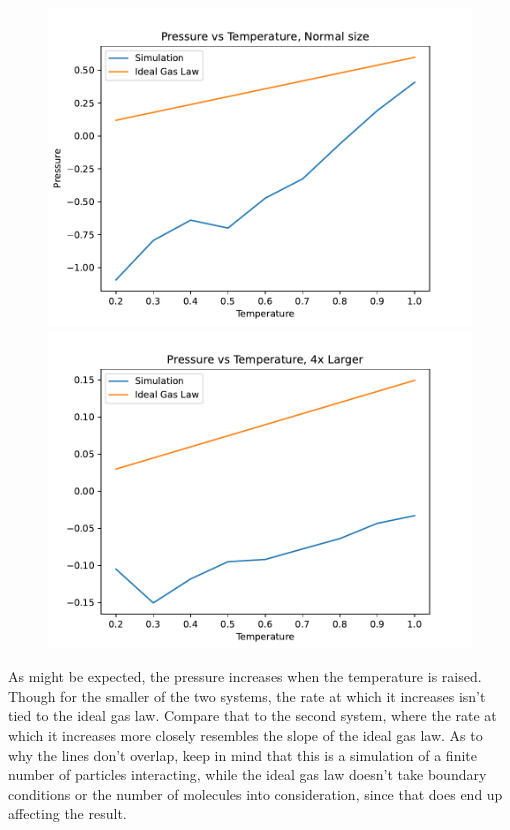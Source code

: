 \documentclass[a4paper,12pt]{article}
\begin{document}
\begin{figure}[!ht]
  \centering
  \begin{minipage}{0.49\textwidth}
    \includegraphics[width=\textwidth]{img/3_2e_PvsT_normal.pdf}
  \end{minipage}
  \begin{minipage}{0.49\textwidth}
    \includegraphics[width=\textwidth]{img/3_2e_PvsT_big.pdf}
  \end{minipage}
\end{figure}

As might be expected, the pressure increases when the temperature is raised. Though for the smaller of the two
systems, the rate at which it increases isn't tied to the ideal gas law. Compare that to the second system, where the
rate at which it increases more closely resembles the slope of the ideal gas law. As to why the lines don't overlap,
keep in mind that this is a simulation of a finite number of particles interacting, while the ideal gas law doesn't
take boundary conditions or the number of molecules into consideration, since that does end up affecting the result.
\end{document}
